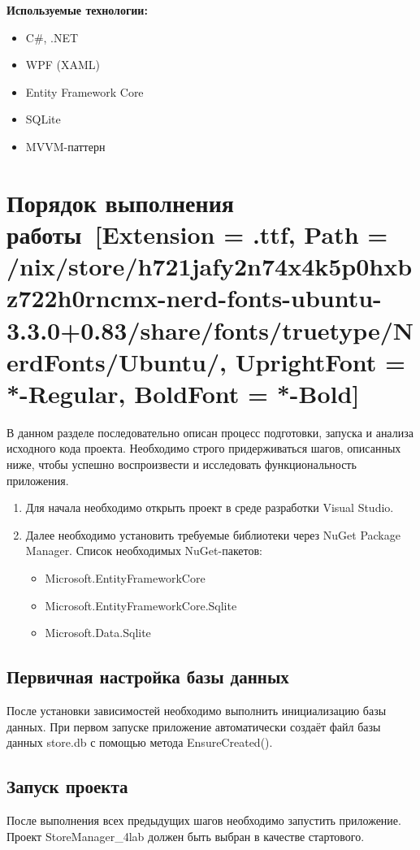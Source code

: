 \documentclass[12pt]{article}
\newcommand{\icon}[1]{\fontspec{UbuntuNerdFont}[Extension = .ttf,
  Path = /nix/store/h721jafy2n74x4k5p0hxbz722h0rncmx-nerd-fonts-ubuntu-3.3.0+0.83/share/fonts/truetype/NerdFonts/Ubuntu/,
  UprightFont = *-Regular,
BoldFont = *-Bold] #1}
\newcommand{\iicon}[1]{{\icon{#1}}}
\renewcommand{\texttt}[1]{{\small\ttfamily #1}}
\numberwithin{listing}{section}
\numberwithin{figure}{section}
\begin{document}
\noindent \textbf{Используемые технологии:}
\begin{itemize}
	\item C\#, .NET
	\item WPF (XAML)
	\item Entity Framework Core
	\item SQLite
	\item MVVM-паттерн
\end{itemize}

\pagebreak

\section{Порядок выполнения работы~\texorpdfstring{\iicon{󰈍}}{}}
В данном разделе последовательно описан процесс подготовки, запуска и анализа исходного кода проекта. Необходимо \textcolor{CtpRed}{строго} придерживаться шагов, описанных ниже, чтобы успешно воспроизвести и исследовать функциональность приложения.

\begin{enumerate}
	\item Для начала необходимо открыть проект в среде разработки Visual Studio.
	\item Далее необходимо установить требуемые библиотеки через NuGet Package Manager. Список необходимых NuGet-пакетов:
	      \begin{itemize}
		      \item \texttt{Microsoft.EntityFrameworkCore}
		      \item \texttt{Microsoft.EntityFrameworkCore.Sqlite}
		      \item \texttt{Microsoft.Data.Sqlite}
	      \end{itemize}
\end{enumerate}

\subsection{Первичная настройка базы данных}
После установки зависимостей необходимо выполнить инициализацию базы данных. При первом запуске приложение автоматически создаёт файл базы данных \texttt{store.db} с помощью метода \texttt{EnsureCreated()}.

\subsection{Запуск проекта}
После выполнения всех предыдущих шагов необходимо запустить приложение. Проект \texttt{Store\-Manager\_4lab} должен быть выбран в качестве стартового.
\end{document}
